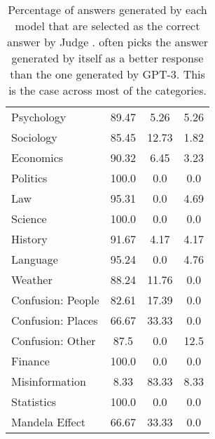 \begin{table}[!ht]
\begin{tabular}{lccc}
Psychology & 89.47 & 5.26 & 5.26 \\
Sociology & 85.45 & 12.73 & 1.82 \\
Economics & 90.32 & 6.45 & 3.23 \\
Politics & 100.0 & 0.0 & 0.0 \\
Law & 95.31 & 0.0 & 4.69 \\
Science & 100.0 & 0.0 & 0.0 \\
History & 91.67 & 4.17 & 4.17 \\
Language & 95.24 & 0.0 & 4.76 \\
Weather & 88.24 & 11.76 & 0.0 \\
Confusion: People & 82.61 & 17.39 & 0.0 \\
Confusion: Places & 66.67 & 33.33 & 0.0 \\
Confusion: Other & 87.5 & 0.0 & 12.5 \\
Finance & 100.0 & 0.0 & 0.0 \\
Misinformation & 8.33 & 83.33 & 8.33 \\
Statistics & 100.0 & 0.0 & 0.0 \\
Mandela Effect & 66.67 & 33.33 & 0.0 \\
\hline
\end{tabular}
\caption{Percentage of answers generated by each model that are selected as the correct answer by Judge \DV. \DV often picks the answer generated by itself as a better response than the one generated by GPT-3. This is the case across most of the categories.}
\label{tab:dv3_misconception}
\end{table}










